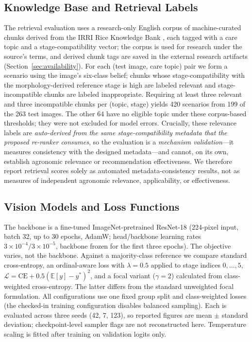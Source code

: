\documentclass[conference,a4paper]{IEEEtran}
\begin{document}
\subsection{Knowledge Base and Retrieval Labels}

The retrieval evaluation uses a research-only English corpus of machine-curated chunks derived from the IRRI Rice Knowledge Bank \cite{irriRiceKnowledgeBank},  each tagged with a care topic and a stage-compatibility vector; the corpus is used for research under the source's terms, and derived chunk tags are saved in the external research artifacts (Section~\ref{sec:availability}). For each (test image, care topic) pair we form a scenario using the image's six-class belief; chunks whose stage-compatibility with the morphology-derived reference stage is high are labeled relevant and stage-incompatible chunks are labeled inappropriate. Requiring at least three relevant and three incompatible chunks per (topic, stage) yields 420 scenarios from 199 of the 263 test images. The other 64 have no eligible topic under these corpus-based thresholds; they were not excluded for model errors. Crucially, these relevance labels are \emph{auto-derived from the same stage-compatibility metadata that the proposed re-ranker consumes}, so the evaluation is a \emph{mechanism validation}---it measures consistency with the designed metadata---and cannot, on its own, establish agronomic relevance or recommendation effectiveness. We therefore report retrieval scores solely as automated metadata-consistency results, not as measures of independent agronomic relevance, applicability, or effectiveness.

\subsection{Vision Models and Loss Functions}

The backbone is a fine-tuned ImageNet-pretrained ResNet-18 (224-pixel input, batch 32, up to 30 epochs, AdamW; head/backbone learning rates $3\times10^{-4}/3\times10^{-5}$, backbone frozen for the first three epochs). The objective varies, not the backbone. Against a majority-class reference we compare standard cross-entropy, an ordinal-aware loss with $\lambda=0.5$ applied to stage indices $0,\ldots,5$, $\mathcal{L}=\mathrm{CE}+0.5(\mathbb{E}[y]-y^*)^2$, and a focal variant ($\gamma=2$) calculated from class-weighted cross-entropy. The latter differs from the standard unweighted focal formulation. All configurations use one fixed group split and class-weighted losses (the checked-in training configuration disables balanced sampling). Each is evaluated across three seeds (42, 7, 123), so reported figures are mean $\pm$ standard deviation; checkpoint-level sampler flags are not reconstructed here. Temperature scaling is fitted after training on validation logits only.
\end{document}
